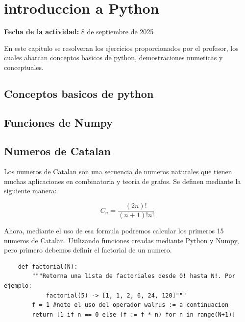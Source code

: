 \documentclass[../portafolio.tex]{subfiles}
\begin{document}
\chapter{introduccion a Python}
\label{ch:ejercicios-python}


\hfill \textbf{Fecha de la actividad:} 8 de septiembre de 2025

\medskip


En este capitulo se resolveran los ejercicios proporcionados por el profesor, los
cuales abarcan conceptos basicos de python, demostraciones numericas y conceptuales.

\medskip

\section*{Conceptos basicos de python}



\section*{Funciones de Numpy}



\section*{Numeros de Catalan}

Los numeros de Catalan son una secuencia de numeros naturales que tienen muchas aplicaciones en combinatoria
y teoria de grafos. Se definen mediante la siguiente manera:

\begin{equation}
    C_n = \frac{(2n)!}{(n+1)!n!}
\end{equation}

Ahora, mediante el uso de esa formula podremos calcular los primeros 15 numeros de Catalan.
Utilizando funciones creadas mediante Python y Numpy, pero primero debemos definir el factorial de un numero.

\begin{lstlisting}
    def factorial(N):
        """Retorna una lista de factoriales desde 0! hasta N!. Por ejemplo:
            factorial(5) -> [1, 1, 2, 6, 24, 120]"""
        f = 1 #note el uso del operador walrus := a continuacion
        return [1 if n == 0 else (f := f * n) for n in range(N+1)]
\end{lstlisting}
\end{document}
